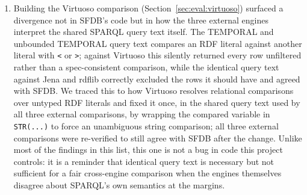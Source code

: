 \begin{enumerate}
          required repeating the $10^5$-fact CONTEXT benchmark in a
          separate process from the one that produced
          Section~\ref{sec:eval:query}'s numbers, to run it alongside the
          Jena queries under identical conditions. The two measurements
          disagreed by $\sim\!45\%$ ($712$\,ms versus $1\,044$\,ms) despite
          both being ten-sample means of a seeded, deterministic benchmark
          with sub-$2\%$ within-run confidence intervals. This is not a
          code bug --- both numbers are real measurements of the same
          code --- but a gap in what the within-run statistics can see:
          they capture noise \emph{within} one process's ten samples, not
          variation \emph{across} independent process launches. We
          reproduced the higher figure with no other process running at
          all, ruling out contention with the concurrent Jena/Fuseki
          server as the explanation. A third independent process launch,
          needed to apply the query-portability fix in the next finding,
          produced a third value ($989$\,ms) in the same span,
          reinforcing rather than undermining the finding.
    \item Building the Virtuoso comparison (Section~\ref{sec:eval:virtuoso})
          surfaced a divergence not in SFDB's code but in how the three
          external engines interpret the shared SPARQL query text
          itself. The TEMPORAL and unbounded TEMPORAL query text
          compares an RDF literal against another literal with
          \texttt{<} or \texttt{>}; against Virtuoso this silently
          returned every row unfiltered rather than a spec-consistent
          comparison, while the identical query text against Jena and
          rdflib correctly excluded the rows it should have and agreed
          with SFDB. We traced this to how Virtuoso resolves relational
          comparisons over untyped RDF literals and fixed it once, in
          the shared query text used by all three external comparisons,
          by wrapping the compared variable in \texttt{STR(...)} to
          force an unambiguous string comparison; all three external
          comparisons were re-verified to still agree with SFDB after
          the change. Unlike most of the findings in this list, this one
          is
          not a bug in code this project controls: it is a reminder that
          identical query text is necessary but not sufficient for a
          fair cross-engine comparison when the engines themselves
          disagree about SPARQL's own semantics at the margins.

\end{enumerate}
